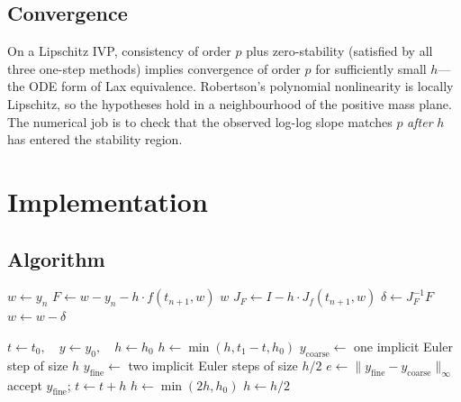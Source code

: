 \documentclass[11pt,a4paper]{article}
\begin{document}
\subsection{Convergence}
On a Lipschitz IVP, consistency of order \(p\) plus zero-stability (satisfied by all three one-step methods) implies convergence of order \(p\) for sufficiently small \(h\)---the ODE form of Lax equivalence. Robertson's polynomial nonlinearity is locally Lipschitz, so the hypotheses hold in a neighbourhood of the positive mass plane. The numerical job is to check that the observed log-log slope matches \(p\) \emph{after} \(h\) has entered the stability region.

\section{Implementation}
\label{sec:impl}
\subsection{Algorithm}

\begin{algorithm}[H]
\caption{Implicit Euler step by Newton. Tolerance \(\mathrm{tol}=10^{-12}\).}
\label{alg:newton}
\begin{algorithmic}[1]
  \State \(w \gets y_n\)
    \State \(F \gets w - y_n - h\cdot f(t_{n+1},w)\)
      \State \Return \(w\)
    \EndIf
    \State \(J_F \gets I - h\cdot J_f(t_{n+1},w)\)
    \State \(\delta \gets J_F^{-1} F\)
    \State \(w \gets w - \delta\)
  \EndFor
\EndProcedure
\end{algorithmic}
\end{algorithm}

\begin{algorithm}[H]
\caption{Step-doubling adaptive implicit Euler.}
\label{alg:adapt}
\begin{algorithmic}[1]
  \State \(t \gets t_0,\quad y \gets y_0,\quad h \gets h_0\)
    \State \(h \gets \min(h,t_1-t,h_0)\)
    \State \(y_{\mathrm{coarse}} \gets \) one implicit Euler step of size \(h\)
    \State \(y_{\mathrm{fine}} \gets \) two implicit Euler steps of size \(h/2\)
    \State \(e \gets \|y_{\mathrm{fine}}-y_{\mathrm{coarse}}\|_\infty\)
      \State accept \(y_{\mathrm{fine}}\); \(t \gets t+h\)
       \(h \gets \min(2h,h_0)\) \EndIf
    \Else
      \State \(h \gets h/2\) 
    \EndIf
  \EndWhile
\EndProcedure
\end{algorithmic}
\end{algorithm}
\end{document}
